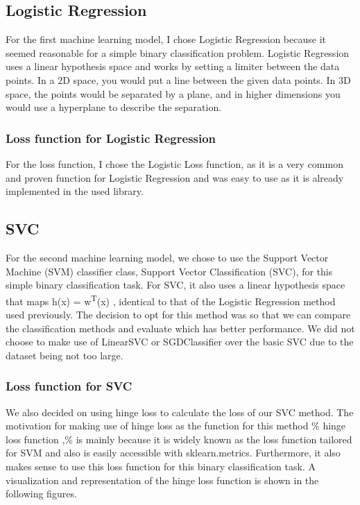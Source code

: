 \documentclass[a4paper,12pt]{article}
\begin{document}
\subsection{Logistic Regression}
\label{sec:org22f2252}
For the first machine learning model, I chose Logistic Regression because it seemed reasonable for a simple binary classification problem.
Logistic Regression uses a linear hypothesis space and works by setting a limiter between the data points.
In a 2D space, you would put a line between the given data points. In 3D space, the points would be separated by a plane, and in higher dimensions you would use a hyperplane to describe the separation.

\subsubsection{Loss function for Logistic Regression}
\label{sec:orge7dcfb2}
For the loss function, I chose the Logistic Loss function, as it is a very common and proven function for Logistic Regression and was easy to use as it is already implemented in the used library.

\subsection{SVC}
\label{sec:org1317560}
For the second machine learning model, we chose to use the Support Vector Machine (SVM) classifier class, Support Vector Classification (SVC), for this simple binary classification task. For SVC, it also uses a linear hypothesis space that maps h(x) = w\textsuperscript{T}(x) , identical to that of the Logistic Regression method used previously. The decision to opt for this method was so that we can compare the classification methods and evaluate which has better performance. We did not choose to make use of LinearSVC or SGDClassifier over the basic SVC due to the dataset being not too large.
\subsubsection{Loss function for SVC}
\label{sec:orga4eb452}
We also decided on using hinge loss to calculate the loss of our SVC method. The motivation for making use of hinge loss as the function for this method \% hinge loss function  ,\% is mainly because it is widely known as the loss function tailored for SVM and also is easily accessible with sklearn.metrics. Furthermore, it also makes sense to use this loss function for this binary classification task. A visualization and representation of the hinge loss function is shown in the following figures.
\end{document}
